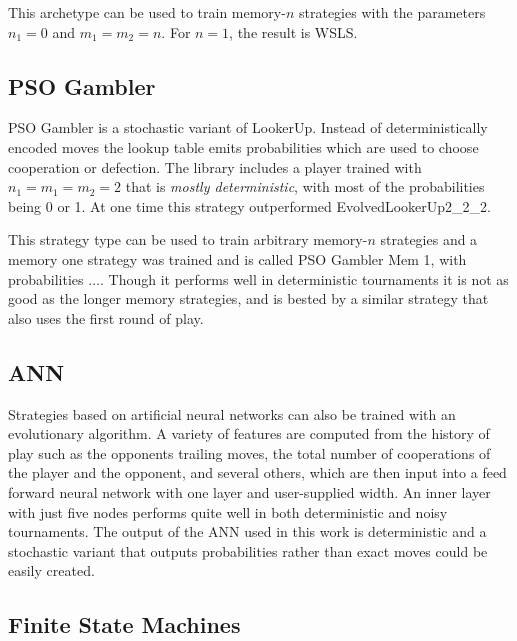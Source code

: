 \documentclass{article}
\begin{document}
This archetype can be used to train memory-$n$ strategies with the parameters
$n_1=0$ and $m_1=m_2=n$. For $n=1$, the result is WSLS.

\subsection{PSO Gambler}

PSO Gambler is a stochastic variant of LookerUp. Instead of deterministically
encoded moves the lookup table emits probabilities which are
used to choose cooperation or defection. The library includes a player trained
with $n_1 = m_1 = m_2 = 2$ that is \emph{mostly deterministic}, with most of the
probabilities being 0 or 1. At one time this strategy outperformed
EvolvedLookerUp2_2_2.

This strategy type can be used to train arbitrary memory-$n$ strategies and a
memory one strategy was trained and is called PSO Gambler Mem 1, with
probabilities $\ldots$. Though it performs well in deterministic tournaments
it is not as good as the longer memory strategies, and is bested by a similar
strategy that also uses the first round of play.


\subsection{ANN}

Strategies based on artificial neural networks can also be trained with an
evolutionary algorithm. A variety of features are computed from the history
of play such as the opponents trailing moves, the total number of cooperations
of the player and the opponent, and several others, which are then input
into a feed forward neural network with one layer and user-supplied width.
An inner layer with just five nodes performs quite well in both deterministic and
noisy tournaments. The output of the ANN used in this work is deterministic and
a stochastic variant that outputs probabilities rather than exact moves could
be easily created.


\subsection{Finite State Machines}
\end{document}

